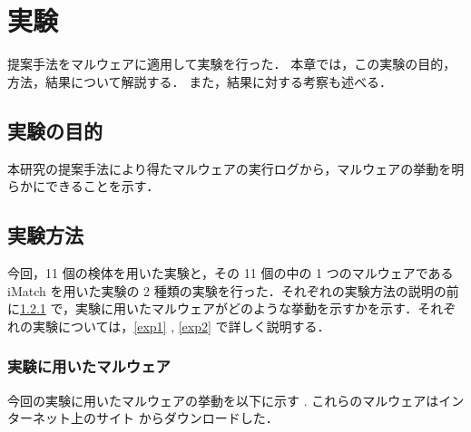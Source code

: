 \section{実験}
\label{sec:exp}
提案手法をマルウェアに適用して実験を行った．
本章では，この実験の目的，方法，結果について解説する．
また，結果に対する考察も述べる．

\subsection{実験の目的}
本研究の提案手法により得たマルウェアの実行ログから，マルウェアの挙動を明らかにできることを示す．

\subsection{実験方法}
今回，11 個の検体を用いた実験と，その 11 個の中の 1 つのマルウェアである iMatch を用いた実験の 2 種類の実験を行った．それぞれの実験方法の説明の前に\ref{expmalware} で，実験に用いたマルウェアがどのような挙動を示すかを示す．それぞれの実験については，\ref{exp1} , \ref{exp2} で詳しく説明する．

\subsubsection{実験に用いたマルウェア}
\label{expmalware}
今回の実験に用いたマルウェアの挙動を以下に示す \cite{golddream} \cite{basebridge} \cite{droiddreamlight} \cite{crazyapp} \cite{icalendar} \cite{snake} \cite{trojan} . これらのマルウェアはインターネット上のサイト \cite{malwaresite} からダウンロードした．

